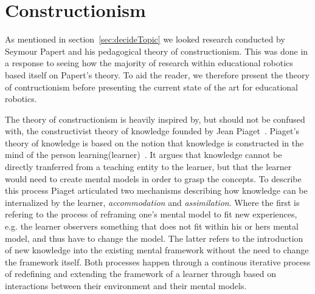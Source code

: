 \chapter{Constructionism}
As mentioned in section~\ref{sec:decideTopic} we looked research conducted by Seymour Papert and his pedagogical theory of constructionism. 
This was done in a response to seeing how the majority of research within educational robotics based itself on Papert's theory. 
To aid the reader, we therefore present the theory of contructionism before presenting the current state of the art for educational robotics. 

\bigskip\noindent
The theory of constructionism is heavily inspired by, but should not be confused with, the constructivist theory of knowledge founded by Jean Piaget~\cite{cakir2008constructivist}.
Piaget's theory of knowledge is based on the notion that knowledge is constructed in the mind of the person learning(learner)~\cite{bodner1986constructivism}. It argues that knowledge cannot be directly tranferred from a teaching entity to the learner, but that the learner would need to create mental models in order to grasp the concepts. 
To describe this process Piaget articulated two mechanisms describing how knowledge can be internalized by the learner, \textit{accommodation} and \textit{assimilation}. 
Where the first is refering to the process of reframing one's mental model to fit new experiences, e.g. the learner observers something that does not fit within his or hers mental model, and thus have to change the model. The latter refers to the introduction of new knowledge into the existing mental framework without the need to change the framework itself. Both processes happen through a continous iterative process of redefining and extending the framework of a learner through based on  interactions between their environment and their mental models. 


